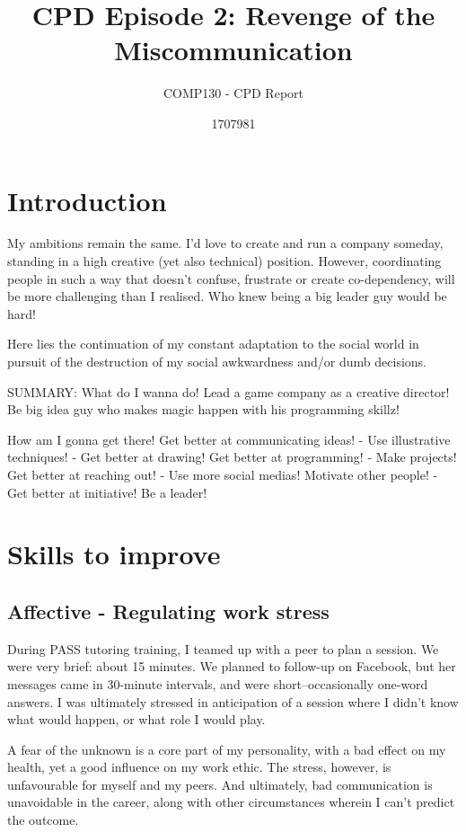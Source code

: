 \documentclass{scrartcl}
\title{CPD Episode 2: Revenge of the Miscommunication}
\subtitle{COMP130 - CPD Report}
\author{1707981}
\begin{document}
\maketitle

\section{Introduction} %
My ambitions remain the same. I'd love to create and run a company someday, standing in a high creative (yet also technical) position. However, coordinating people in such a way that doesn't confuse, frustrate or create co-dependency, will be more challenging than I realised. Who knew being a big leader guy would be hard!

Here lies the continuation of my constant adaptation to the social world in pursuit of the destruction of my social awkwardness and/or dumb decisions.

SUMMARY: What do I wanna do!
Lead a game company as a creative director! Be big idea guy who makes magic happen with his programming skillz!

How am I gonna get there!
Get better at communicating ideas!
- Use illustrative techniques!
- Get better at drawing!
Get better at programming!
- Make projects!
Get better at reaching out!
- Use more social medias!
Motivate other people!
- 
Get better at initiative!
Be a leader!


\section{Skills to improve}
\subsection{Affective - Regulating work stress} %
During PASS tutoring training, I teamed up with a peer to plan a session. We were very brief: about 15 minutes. We planned to follow-up on Facebook, but her messages came in 30-minute intervals, and were short--occasionally one-word answers. I was ultimately stressed in anticipation of a session where I didn't know what would happen, or what role I would play.

A fear of the unknown is a core part of my personality, with a bad effect on my health, yet a good influence on my work ethic. The stress, however, is unfavourable for myself and my peers. And ultimately, bad communication is unavoidable in the career, along with other circumstances wherein I can't predict the outcome.
\end{document}
